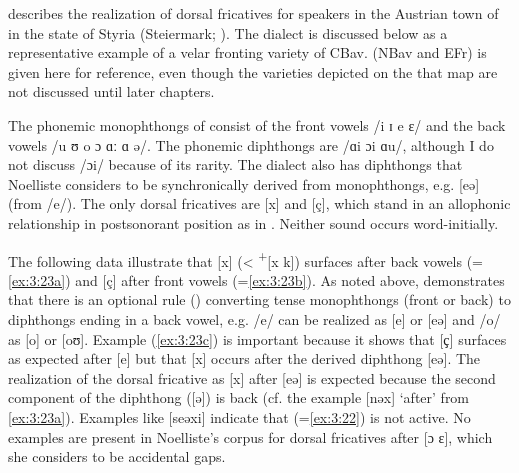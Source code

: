 \citet{Noelliste2017} describes the realization of dorsal fricatives for speakers in the Austrian town of  in the state of Styria (Steiermark;  ). The dialect is discussed below as a representative example of a velar fronting variety of CBav.  (NBav and EFr) is given here for reference, even though the varieties depicted on the that map are not discussed until later chapters.

The phonemic monophthongs of  consist of the front vowels /i ɪ e ɛ/ and the back vowels /u ʊ o ɔ ɑː ɑ ə/. The phonemic diphthongs are /ɑi ɔi ɑu/, although I do not discuss /ɔi/ because of its rarity. The dialect also has diphthongs that Noelliste considers to be synchronically derived from monophthongs, e.g. [eə] (from /e/). The only dorsal fricatives are [x] and [ç], which stand in an allophonic relationship in postsonorant position as in . Neither sound occurs word-initially.

The following data illustrate that [x] (< \textsc{\textsuperscript{+}}[x k]) surfaces after back vowels (=\ref{ex:3:23a}) and [ç] after front vowels (=\ref{ex:3:23b}). As noted above, \citet{Noelliste2017} demonstrates that there is an optional rule () converting tense monophthongs (front or back) to diphthongs ending in a back vowel, e.g. /e/ can be realized as [e] or [eə] and /o/ as [o] or [oʊ]. Example (\ref{ex:3:23c}) is important because it shows that [{ҫ] surfaces as expected after [e] but that [x] occurs after the derived diphthong [e{ə}]. The realization of the dorsal fricative as [x] after [e{ə}] is expected because the second component of the diphthong ([{ə}]) is back (cf. the example [n{ə}x] ‘after’ from \ref{ex:3:23a}). Examples like [se{ə}xi] indicate that  (=\ref{ex:3:22}) is not active. No examples are present in Noelliste’s corpus for dorsal fricatives after [}ɔ ɛ], which she considers to be accidental gaps.\pagebreak

